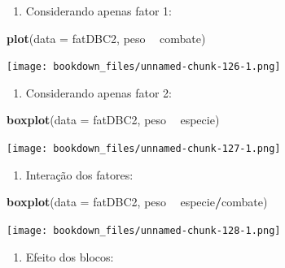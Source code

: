 \documentclass[
]{article}
\newenvironment{Shaded}{\begin{snugshade}}{\end{snugshade}}
\newcommand{\DataTypeTok}[1]{\textcolor[rgb]{0.13,0.29,0.53}{#1}}
\newcommand{\KeywordTok}[1]{\textcolor[rgb]{0.13,0.29,0.53}{\textbf{#1}}}
\newcommand{\NormalTok}[1]{#1}
\newcommand{\OperatorTok}[1]{\textcolor[rgb]{0.81,0.36,0.00}{\textbf{#1}}}
\newcommand{\StringTok}[1]{\textcolor[rgb]{0.31,0.60,0.02}{#1}}
\providecommand{\tightlist}{%
  \setlength{\itemsep}{0pt}\setlength{\parskip}{0pt}}
\begin{document}
\begin{enumerate}
\def\labelenumi{\arabic{enumi}.}
\tightlist
\item
  Considerando apenas fator 1:
\end{enumerate}

\begin{Shaded}
\begin{Highlighting}[]
\KeywordTok{plot}\NormalTok{(}\DataTypeTok{data =}\NormalTok{ fatDBC2, peso }\OperatorTok{~}\StringTok{ }\NormalTok{combate)}
\end{Highlighting}
\end{Shaded}

\texttt{[image: bookdown\_files/unnamed-chunk-126-1.png]}

\begin{enumerate}
\def\labelenumi{\arabic{enumi}.}
\setcounter{enumi}{1}
\tightlist
\item
  Considerando apenas fator 2:
\end{enumerate}

\begin{Shaded}
\begin{Highlighting}[]
\KeywordTok{boxplot}\NormalTok{(}\DataTypeTok{data =}\NormalTok{ fatDBC2, peso }\OperatorTok{~}\StringTok{ }\NormalTok{especie)}
\end{Highlighting}
\end{Shaded}

\texttt{[image: bookdown\_files/unnamed-chunk-127-1.png]}

\begin{enumerate}
\def\labelenumi{\arabic{enumi}.}
\setcounter{enumi}{2}
\tightlist
\item
  Interação dos fatores:
\end{enumerate}

\begin{Shaded}
\begin{Highlighting}[]
\KeywordTok{boxplot}\NormalTok{(}\DataTypeTok{data =}\NormalTok{ fatDBC2, peso }\OperatorTok{~}\StringTok{ }\NormalTok{especie}\OperatorTok{/}\NormalTok{combate)}
\end{Highlighting}
\end{Shaded}

\texttt{[image: bookdown\_files/unnamed-chunk-128-1.png]}

\begin{enumerate}
\def\labelenumi{\arabic{enumi}.}
\setcounter{enumi}{3}
\tightlist
\item
  Efeito dos blocos:
\end{enumerate}
\end{document}
